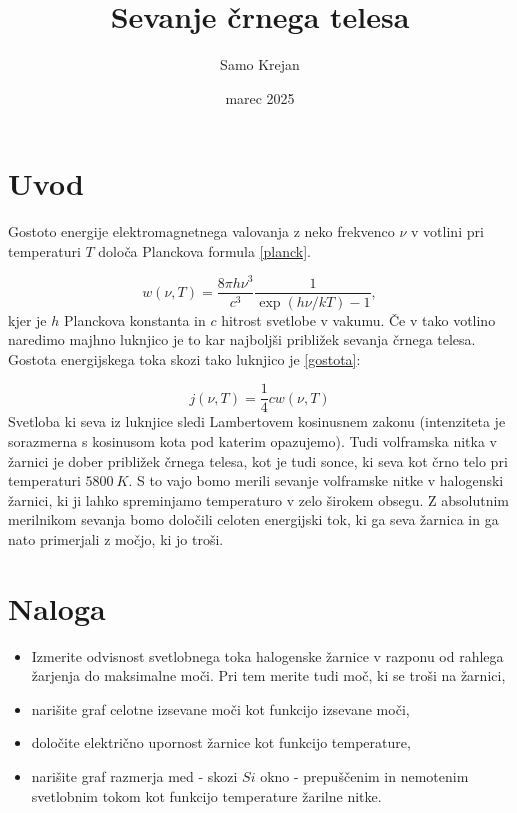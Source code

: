 \documentclass[10pt]{article}
\title{Sevanje črnega telesa}
\author{Samo Krejan}
\date{marec 2025}
\begin{document}
\maketitle

\section{Uvod}

Gostoto energije elektromagnetnega valovanja z neko frekvenco $\nu$ v votlini pri temperaturi $T$ določa Planckova formula \ref{planck}.

\begin{equation}
    w(\nu, T) = \frac{8\pi h \nu^3}{c^3} \frac{1}{\exp(h\nu/kT) -1},
    \label{planck}
\end{equation}
kjer je $h$ Planckova konstanta in $c$ hitrost svetlobe v vakumu. Če v tako votlino naredimo majhno luknjico je to kar najboljši približek sevanja črnega telesa. Gostota energijskega toka skozi tako luknjico je \ref{gostota}:

\begin{equation}
    j(\nu, T) = \frac{1}{4} c w(\nu,T)
    \label{gostota}
\end{equation}
Svetloba ki seva iz luknjice sledi Lambertovem kosinusnem zakonu (intenziteta je sorazmerna s kosinusom kota pod katerim opazujemo). Tudi volframska nitka v žarnici je dober približek črnega telesa, kot je tudi sonce, ki seva kot črno telo pri temperaturi $5800\ K$. S to vajo bomo merili sevanje volframske nitke v halogenski žarnici, ki ji lahko spreminjamo temperaturo v zelo širokem obsegu. Z absolutnim merilnikom sevanja bomo določili celoten energijski tok, ki ga seva žarnica in ga nato primerjali z močjo, ki jo troši.


\section{Naloga}

\begin{itemize}
    \item Izmerite odvisnost svetlobnega toka halogenske žarnice v razponu od rahlega žarjenja do maksimalne moči. Pri tem merite tudi moč, ki se troši na žarnici,
    \item narišite graf celotne izsevane moči kot funkcijo izsevane moči,
    \item določite električno upornost žarnice kot funkcijo temperature,
    \item narišite graf razmerja med - skozi $Si$ okno - prepuščenim in nemotenim svetlobnim tokom kot funkcijo temperature žarilne nitke.
\end{itemize}
\end{document}
